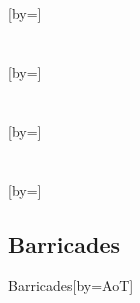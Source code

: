 \documentclass{article}
\begin{document}
\begin{songs}{}
\section{}

\begin{song}{}[by={}]
\beginverse

\endverse
\end{song}





\section{}

\begin{song}{}[by={}]
\beginverse

\endverse
\beginverse

\endverse
\end{song}






\end{songs}

\begin{songs}{}

\section{}
\begin{song}{}[by={}]
\beginverse

\endverse
\end{song}

\section{}
\begin{song}{}[by={}]
\beginverse

\endverse
\end{song}
\end{songs}

\begin{songs}{}
\section{Barricades}

\begin{song}{Barricades}[by={AoT}]
\beginverse

\endverse
\end{song}
\end{songs}
\end{document}
